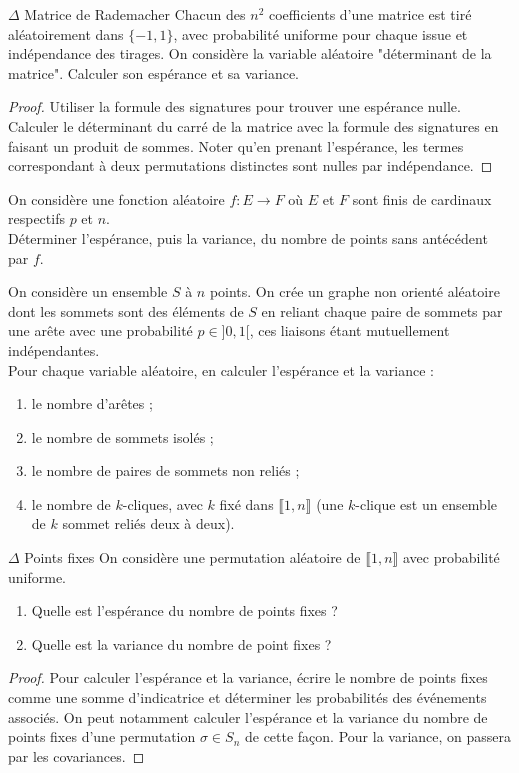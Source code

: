 \documentclass[french,a4paper]{article}
\theoremstyle{plain}
\theoremstyle{definition}
\theoremstyle{remark}
\begin{document}
\begin{ex}{$\Delta$	Matrice de Rademacher}
	Chacun des $n^2$ coefficients d'une matrice est tiré aléatoirement dans $\{-1,1\}$, avec probabilité uniforme pour chaque issue et indépendance des tirages. On considère la variable aléatoire "déterminant de la matrice". Calculer son espérance et sa variance.
\end{ex}
\begin{proof}
	Utiliser la formule des signatures pour trouver une espérance nulle. Calculer le déterminant du carré de la matrice avec la formule des signatures en faisant un produit de sommes. Noter qu'en prenant l'espérance, les termes correspondant à deux permutations distinctes sont nulles par indépendance.
\end{proof}

\begin{ex}{}
	On considère une fonction aléatoire $f:E\to F$ où $E$ et $F$ sont finis de cardinaux respectifs $p$ et $n$. \\ Déterminer l'espérance, puis la variance, du nombre de points sans antécédent par $f$.
\end{ex}

\begin{ex}{}
	On considère un ensemble $S$ à $n$ points. On crée un graphe non orienté aléatoire dont les sommets sont des éléments de $S$ en reliant chaque paire de sommets par une arête avec une probabilité $p\in]0,1[$, ces liaisons étant mutuellement indépendantes. \\ Pour chaque variable aléatoire, en calculer l'espérance et la variance :
	\begin{enumerate}
		\item le nombre d'arêtes ;
		\item le nombre de sommets isolés ;
		\item le nombre de paires de sommets non reliés ;
		\item le nombre de $k$-cliques, avec $k$ fixé dans $\llbracket1,n\rrbracket$ (une $k$-clique est un ensemble de $k$ sommet reliés deux à deux).
	\end{enumerate}
\end{ex}

\begin{ex}{$\Delta$ Points fixes}
	On considère une permutation aléatoire de $\llbracket1,n\rrbracket$ avec probabilité uniforme.
	\begin{enumerate}
		\item Quelle est l'espérance du nombre de points fixes ?
		\item Quelle est la variance du nombre de point fixes ?
	\end{enumerate}
\end{ex}
\begin{proof}
	Pour calculer l'espérance et la variance, écrire le nombre de points fixes comme une somme d'indicatrice et déterminer les probabilités des événements associés. On peut notamment calculer l'espérance et la variance du nombre de points fixes d'une permutation $\sigma\in S_n$ de cette façon. Pour la variance, on passera par les covariances.
\end{proof}
\end{document}
